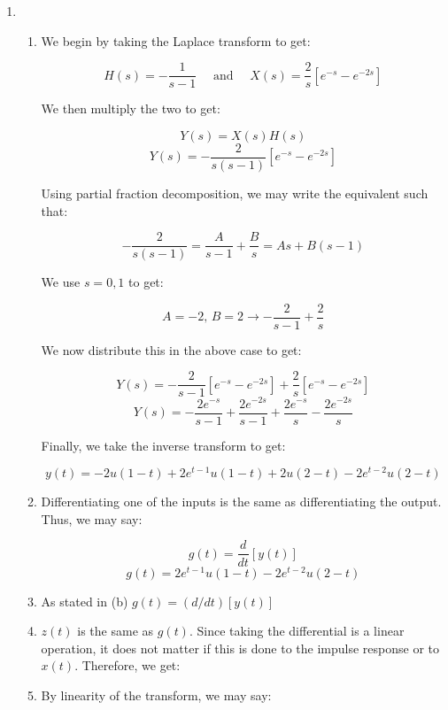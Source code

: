 \begin{enumerate}

  \item

    \begin{enumerate}

      \item We begin by taking the Laplace transform to get:

        $$H(s)=-\frac{1}{s-1}\quad\text{ and }\quad X(s)=\frac{2}{s}\left[  e^{-s}-e^{-2s}\right]$$

        We then multiply the two to get:

        $$Y(s)=X(s)H(s)$$
        $$Y(s)=-\frac{2}{s(s-1)}\left[ e^{-s}-e^{-2s} \right]$$

        Using partial fraction decomposition, we may write the equivalent such that:

        $$-\frac{2}{s(s-1)}=\frac{A}{s-1}+\frac{B}{s}=As+B(s-1)$$

        We use $s=0,1$ to get:

        $$A=-2,\,B=2\to -\frac{2}{s-1}+\frac{2}{s}$$

        We now distribute this in the above case to get:

        $$Y(s)=-\frac{2}{s-1}\left[ e^{-s}-e^{-2s} \right]+\frac{2}{s}\left[ e^{-s}-e^{-2s} \right]$$
        $$Y(s)=-\frac{2e^{-s}}{s-1}+\frac{2e^{-2s}}{s-1}+\frac{2e^{-s}}{s}-\frac{2e^{-2s}}{s}$$

        Finally, we take the inverse transform to get:

        $$\boxed{y(t)=-2u(1-t)+2e^{t-1}u(1-t)+2u(2-t)-2e^{t-2}u(2-t)}$$

      \item 

        Differentiating one of the inputs is the same as differentiating the output. Thus, we may say:

        $$g(t)=\frac{d}{dt}[y(t)]$$
        $$\boxed{g(t)=2e^{t-1}u(1-t)-2e^{t-2}u(2-t)}$$

      \item As stated in (b) \underline{$g(t)=(d/dt)[y(t)]$}

      \item $z(t)$ is the same as $g(t)$. Since taking the differential is a linear operation, it does not matter if this is done to the impulse response or to $x(t)$. Therefore, we get:

      \item By linearity of the transform, we may say:


\end{enumerate}
\end{enumerate}
